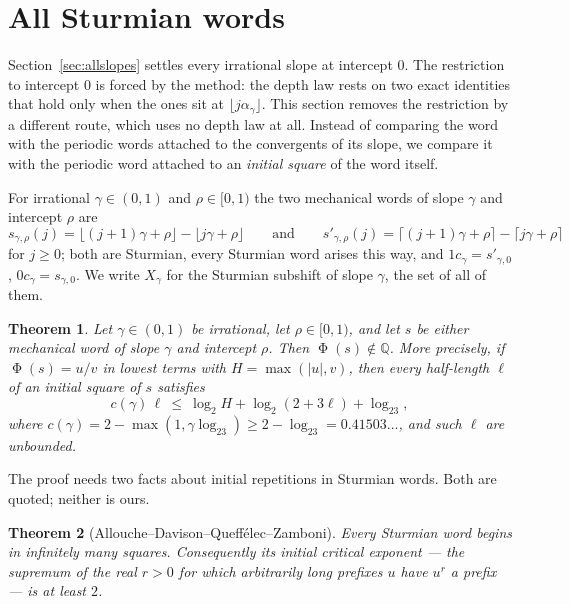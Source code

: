 \documentclass[11pt,reqno]{amsart}
\theoremstyle{plain}
\newtheorem{theorem}{Theorem}[section]
\theoremstyle{definition}
\newcommand{\Q}{\mathbb{Q}}
\DeclareMathOperator{\Ph}{\Phi}
\begin{document}
\section{All Sturmian words}\label{sec:allwords}

Section~\ref{sec:allslopes} settles every irrational slope at intercept $0$.
The restriction to intercept $0$ is forced by the method: the depth law rests on
two exact identities that hold only when the ones sit at
$\lfloor j\alpha_\gamma\rfloor$. This section removes the restriction by a
different route, which uses no depth law at all. Instead of comparing the word
with the periodic words attached to the convergents of its slope, we compare it
with the periodic word attached to an \emph{initial square} of the word itself.

For irrational $\gamma\in(0,1)$ and $\rho\in[0,1)$ the two mechanical words of
slope $\gamma$ and intercept $\rho$ are
\[
 s_{\gamma,\rho}(j)=\lfloor (j+1)\gamma+\rho\rfloor-\lfloor j\gamma+\rho\rfloor
 \qquad\text{and}\qquad
 s'_{\gamma,\rho}(j)=\lceil (j+1)\gamma+\rho\rceil-\lceil j\gamma+\rho\rceil
\]
for $j\ge0$; both are Sturmian, every Sturmian word arises this way, and
$1c_\gamma=s'_{\gamma,0}$, $0c_\gamma=s_{\gamma,0}$. We write $X_\gamma$ for the
Sturmian subshift of slope $\gamma$, the set of all of them.

\begin{theorem}\label{thm:allwords}
Let $\gamma\in(0,1)$ be irrational, let $\rho\in[0,1)$, and let $s$ be either
mechanical word of slope $\gamma$ and intercept $\rho$. Then $\Ph(s)\notin\Q$.
More precisely, if $\Ph(s)=u/v$ in lowest terms with $H=\max(|u|,v)$, then every
half-length $\ell$ of an initial square of $s$ satisfies
\begin{equation}\label{eq:wordskey}
c(\gamma)\,\ell\ \le\ \log_2H+\log_2(2+3\ell)+\log_23 ,
\end{equation}
where $c(\gamma)=2-\max(1,\gamma\log_23)\ge 2-\log_23=0.41503\ldots$,
and such $\ell$ are unbounded.
\end{theorem}

The proof needs two facts about initial repetitions in Sturmian words. Both are
quoted; neither is ours.

\begin{theorem}[Allouche--Davison--Queff\'elec--Zamboni]\label{thm:squares}
Every Sturmian word begins in infinitely many squares. Consequently its initial
critical exponent --- the supremum of the real $r>0$ for which arbitrarily long
prefixes $u$ have $u^{r}$ a prefix --- is at least $2$.
\end{theorem}
\end{document}

